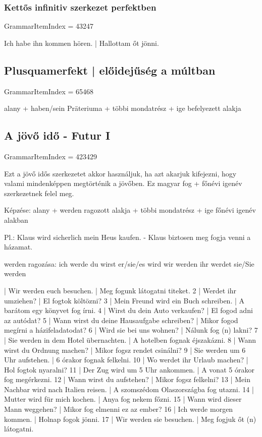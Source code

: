 \documentclass{article}
\newenvironment{desc}{\verbatim}{\endverbatim}
\newenvironment{exmp}{\verbatim}{\endverbatim}
\begin{document}
\subsubsection{Kettős infinitiv szerkezet perfektben}

GrammarItemIndex = 43247

\begin{desc}
Ich habe ihn kommen hören. | Hallottam őt jönni.
\end{desc}

\subsection{Plusquamerfekt | előidejűség a múltban}

GrammarItemIndex = 65468

\begin{desc}
alany + haben/sein Präteriuma + többi mondatrész + ige befelyezett alakja
\end{desc}


\subsection{A jövő idő - Futur I}

GrammarItemIndex = 423429

\begin{desc}
Ezt a jövő idős szerkezetet akkor használjuk, ha azt akarjuk kifejezni, hogy valami mindenképpen megtörténik a jövőben. Ez magyar fog + főnévi igenév szerkezetnek felel meg.

Képzése: alany + werden ragozott alakja + többi mondatrész + ige főnévi igenév alakban

Pl.: Klaus wird sicherlich mein Heus kaufen. - Klaus biztosen meg fogja venni a házamat.

werden ragozása:
ich werde
du wirst
er/sie/es wird
wir werden
ihr werdet
sie/Sie werden
\end{desc}

\begin{exmp}
1 | Wir werden euch besuchen. | Meg fogunk látogatni titeket.
2 | Werdet ihr umziehen? | El fogtok költözni?
3 | Mein Freund wird ein Buch schreiben. | A barátom egy könyvet fog írni.
4 | Wirst du dein Auto verkaufen? | El fogod adni az autódat?
5 | Wann wirst du deine Hausaufgabe schreiben? | Mikor fogod megírni a házifeladatodat?
6 | Wird sie bei uns wohnen? | Nálunk fog (n) lakni?
7 | Sie werden in dem Hotel übernachten. | A hotelben fognak éjszakázni.
8 | Wann wirst du Ordnung machen? | Mikor fogsz rendet csinálni?
9 | Sie werden um 6 Uhr aufstehen. | 6 órakor fognak felkelni.
10 | Wo werdet ihr Urlaub machen? | Hol fogtok nyaralni?
11 | Der Zug wird um 5 Uhr ankommen. | A vonat 5 órakor fog megérkezni.
12 | Wann wirst du aufstehen? | Mikor fogsz felkelni?
13 | Mein Nachbar wird nach Italien reisen. | A szomszédom Olaszországba fog utazni.
14 | Mutter wird für mich kochen. | Anya fog nekem főzni.
15 | Wann wird dieser Mann weggehen? | Mikor fog elmenni ez az ember?
16 | Ich werde morgen kommen. | Holnap fogok jönni.
17 | Wir werden sie besuchen. | Meg fogjuk őt (n) látogatni.
\end{exmp}
\end{document}
